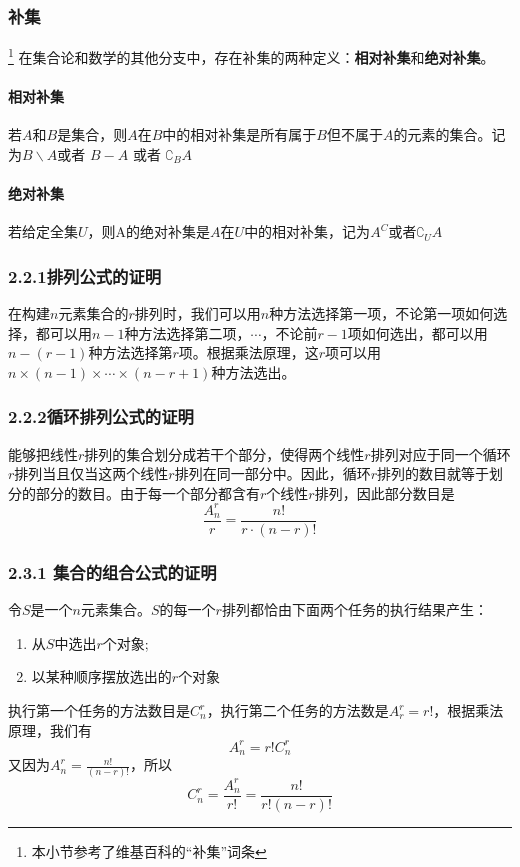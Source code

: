 \documentclass{ctexart}
\begin{document}
    \subsubsection{补集}
    \footnote{本小节参考了维基百科的“补集”词条}
    在集合论和数学的其他分支中，存在补集的两种定义：\textbf{相对补集}和\textbf{绝对补集}。\\
    \paragraph{相对补集}若$A$和$B$是集合，则$A$在$B$中的相对补集是所有属于$B$但不属于$A$的元素的集合。记为$B \backslash A$或者 $B - A$  或者 $\complement_B A$
    \paragraph{绝对补集}若给定全集$U$，则A的绝对补集是$A$在$U$中的相对补集，记为$A^C$或者$\complement_U A$
    \subsubsection{2.2.1排列公式的证明}
   在构建$n$元素集合的$r$排列时，我们可以用$n$种方法选择第一项，不论第一项如何选择，都可以用$n-1$种方法选择第二项，$\cdots$，不论前$r-1$项如何选出，都可以用$n-(r-1)$种方法选择第$r$项。根据乘法原理，这$r$项可以用$n \times (n-1) \times \cdots \times (n-r+1)$种方法选出。
    \subsubsection{2.2.2循环排列公式的证明}
   能够把线性$r$排列的集合划分成若干个部分，使得两个线性$r$排列对应于同一个循环$r$排列当且仅当这两个线性$r$排列在同一部分中。因此，循环$r$排列的数目就等于划分的部分的数目。由于每一个部分都含有$r$个线性$r$排列，因此部分数目是
   \[\frac{A_n^r}{r} = \frac{n!}{r \cdot (n-r)!}\]
   \subsubsection{2.3.1 集合的组合公式的证明}
   令$S$是一个$n$元素集合。$S$的每一个$r$排列都恰由下面两个任务的执行结果产生：
   \begin{enumerate}
       \item 从$S$中选出$r$个对象;
       \item 以某种顺序摆放选出的$r$个对象
   \end{enumerate}
   执行第一个任务的方法数目是$C_n^r$，执行第二个任务的方法数是$A_r^r = r!$，根据乘法原理，我们有
   \[A_n^r = r!C_n^r\]
   又因为$A_n^r = \frac{n!}{(n-r)!}$，所以
   \[C_n^r = \frac{A_n^r}{r!} = \frac{n!}{r!(n-r)!}\]
\end{document}
